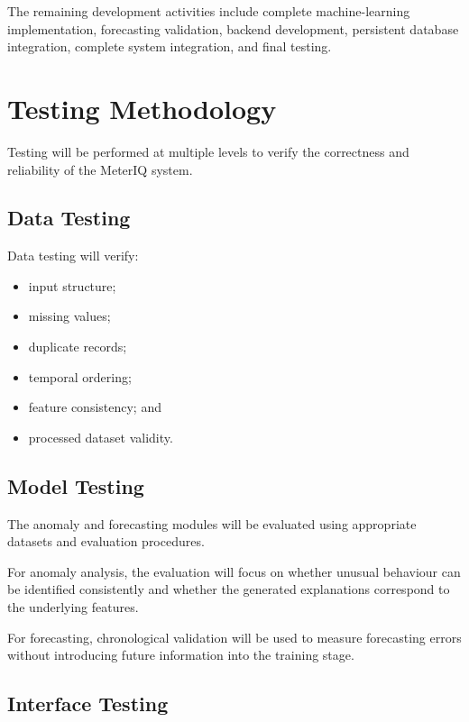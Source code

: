 \documentclass{tietreport}
\begin{document}
The remaining development activities include complete machine-learning
implementation, forecasting validation, backend development, persistent
database integration, complete system integration, and final testing.

\section{Testing Methodology}

Testing will be performed at multiple levels to verify the correctness and
reliability of the MeterIQ system.

\subsection{Data Testing}

Data testing will verify:

\begin{itemize}
    \item input structure;
    \item missing values;
    \item duplicate records;
    \item temporal ordering;
    \item feature consistency; and
    \item processed dataset validity.
\end{itemize}

\subsection{Model Testing}

The anomaly and forecasting modules will be evaluated using appropriate
datasets and evaluation procedures.

For anomaly analysis, the evaluation will focus on whether unusual
behaviour can be identified consistently and whether the generated
explanations correspond to the underlying features.

For forecasting, chronological validation will be used to measure forecasting
errors without introducing future information into the training stage.

\subsection{Interface Testing}
\end{document}
